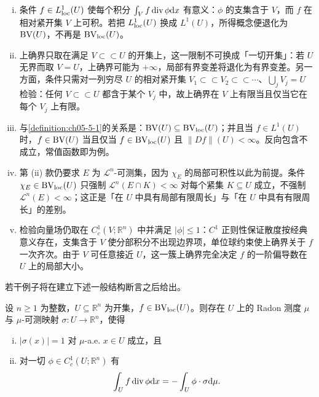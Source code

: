 \documentclass[../../main.tex]{subfiles}%
\begin{document}
\begin{remark}\label{remark:ch05-def-5-2-条件}
\begin{enumerate}[(i)]
\item 条件 $f\in L^1_{\mathrm{loc}}(U)$ 使每个积分 $\int_V f\operatorname{div}\phi\mathrm{d} x$ 有意义：$\phi$ 的支集含于 $V$，而 $f$ 在相对紧开集 $V$ 上可积。若把 $L^1_{\mathrm{loc}}(U)$ 换成 $L^1(U)$，所得概念便退化为 $\mathrm{BV}(U)$，不再是 $\mathrm{BV}_{\mathrm{loc}}(U)$。
\item 上确界只取在满足 $V\subset\subset U$ 的开集上，这一限制不可换成「一切开集」：若 $U$ 无界而取 $V=U$，上确界可能为 $+\infty$，局部有界变差将退化为有界变差。另一方面，条件只需对一列穷尽 $U$ 的相对紧开集 $V_1\subset\subset V_2\subset\subset\cdots$、$\bigcup_{j}V_j=U$ 检验：任何 $V\subset\subset U$ 都含于某个 $V_j$ 中，故上确界在 $V$ 上有限当且仅当它在每个 $V_j$ 上有限。
\item 与\cref{definition:ch05-5-1}的关系是：$\mathrm{BV}(U)\subseteq\mathrm{BV}_{\mathrm{loc}}(U)$；并且当 $f\in L^1(U)$ 时，$f\in\mathrm{BV}(U)$ 当且仅当 $f\in\mathrm{BV}_{\mathrm{loc}}(U)$ 且 $\lVert Df\rVert(U)<\infty$。反向包含不成立，常值函数即为例。%
\item 第 (ii) 款仍要求 $E$ 为 $\mathcal{L}^n$-可测集，因为 $\chi_E$ 的局部可积性以此为前提。条件 $\chi_E\in\mathrm{BV}_{\mathrm{loc}}(U)$ 只强制 $\mathcal{L}^n(E\cap K)<\infty$ 对每个紧集 $K\subseteq U$ 成立，不强制 $\mathcal{L}^n(E)<\infty$；这正是「在 $U$ 中具有局部有限周长」与「在 $U$ 中具有有限周长」的差别。
\item 检验向量场仍取在 $C_c^1(V;\mathbb{R}^n)$ 中并满足 $\lvert\phi\rvert\leqslant1$：$C^1$ 正则性保证散度按经典意义存在，支集含于 $V$ 使分部积分不出现边界项，单位球约束使上确界关于 $f$ 一次齐次。由于 $V$ 可任意接近 $U$，这一簇上确界完全决定 $f$ 的一阶偏导数在 $U$ 上的局部大小。
\end{enumerate}
\end{remark}

若干例子将在建立下述一般结构断言之后给出。

\begin{theorem}\label{theorem:ch05-5-1}
设 $n\geqslant1$ 为整数，$U\subseteq\mathbb{R}^n$ 为开集，$f\in\mathrm{BV}_{\mathrm{loc}}(U)$。则存在 $U$ 上的 Radon 测度 $\mu$ 与 $\mu$-可测映射 $\sigma:U\to\mathbb{R}^n$，使得
\begin{enumerate}[(i)]
\item $\lvert\sigma(x)\rvert=1$ 对 $\mu$-a.e. $x\in U$ 成立，且
\item 对一切 $\phi\in C_c^1(U;\mathbb{R}^n)$ 有
\begin{align*}
\int_U f\operatorname{div}\phi\mathrm{d} x=-\int_U\phi\cdot\sigma\mathrm{d}\mu .
\end{align*}
\end{enumerate}
\end{theorem}
\end{document}
